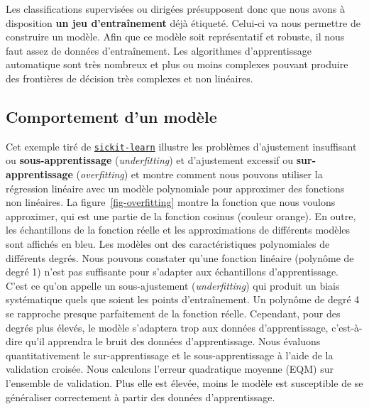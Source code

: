 \documentclass[
  11pt,
  letterpaper,
  open=any,
  twoside=false,
  french]{scrbook}
\begin{document}
Les classifications supervisées ou dirigées présupposent donc que nous
avons à disposition \textbf{un jeu d'entraînement} déjà étiqueté.
Celui-ci va nous permettre de construire un modèle. Afin que ce modèle
soit représentatif et robuste, il nous faut assez de données
d'entraînement. Les algorithmes d'apprentissage automatique sont très
nombreux et plus ou moins complexes pouvant produire des frontières de
décision très complexes et non linéaires.

\subsection{Comportement d'un modèle}\label{comportement-dun-moduxe8le}

Cet exemple tiré de
\href{https://scikit-learn.org/stable/auto_examples/model_selection/plot_underfitting_overfitting.html\#sphx-glr-auto-examples-model-selection-plot-underfitting-overfitting-py}{\texttt{sickit-learn}}
illustre les problèmes d'ajustement insuffisant ou
\textbf{sous-apprentissage} (\emph{underfitting}) et d'ajustement
excessif ou \textbf{sur-apprentissage} (\emph{overfitting}) et montre
comment nous pouvons utiliser la régression linéaire avec un modèle
polynomiale pour approximer des fonctions non linéaires. La
figure~\ref{fig-overfitting} montre la fonction que nous voulons
approximer, qui est une partie de la fonction cosinus (couleur orange).
En outre, les échantillons de la fonction réelle et les approximations
de différents modèles sont affichés en bleu. Les modèles ont des
caractéristiques polynomiales de différents degrés. Nous pouvons
constater qu'une fonction linéaire (polynôme de degré 1) n'est pas
suffisante pour s'adapter aux échantillons d'apprentissage. C'est ce
qu'on appelle un sous-ajustement (\emph{underfitting}) qui produit un
biais systématique quels que soient les points d'entraînement. Un
polynôme de degré 4 se rapproche presque parfaitement de la fonction
réelle. Cependant, pour des degrés plus élevés, le modèle s'adaptera
trop aux données d'apprentissage, c'est-à-dire qu'il apprendra le bruit
des données d'apprentissage. Nous évaluons quantitativement le
sur-apprentissage et le sous-apprentissage à l'aide de la validation
croisée. Nous calculons l'erreur quadratique moyenne (EQM) sur
l'ensemble de validation. Plus elle est élevée, moins le modèle est
susceptible de se généraliser correctement à partir des données
d'apprentissage.
\end{document}

